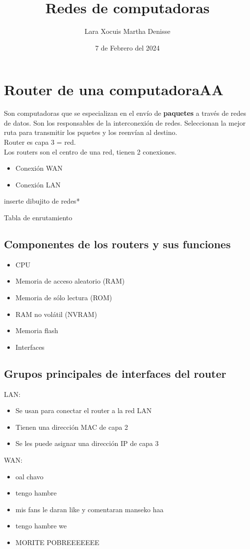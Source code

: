 \documentclass[letterpaper,12pt]{article}
\title {\textbf{Redes de computadoras}}
\author{Lara Xocuis Martha Denisse}
\date{7 de Febrero del 2024}
\begin{document}
\maketitle
\newpage
\begin{sloppypar}

\section{Router de una computadoraAA}
Son computadoras que se especializan en el envío de \textbf{paquetes} a través de redes de datos. Son los responsables de la interconexión de redes. Seleccionan la mejor ruta para transmitir los pquetes y los reenvían al destino.
\vspace{0.3cm}\\ 
Router es capa 3 = red.
\vspace{0.3cm}\\
Los routers son el centro de una red, tienen 2 conexiones.
\begin{itemize}
    \item Conexión WAN 
    \item Conexión LAN
\end{itemize}

inserte dibujito de redes*

Tabla de enrutamiento

\subsection{Componentes de los routers y sus funciones} 
\begin{itemize}
    \item CPU 
    \item Memoria de acceso aleatorio (RAM)
    \item Memoria de sólo lectura (ROM)
    \item RAM no volátil (NVRAM)
    \item Memoria flash
    \item Interfaces
\end{itemize}

\subsection{Grupos principales de interfaces del router}
LAN:
\begin{itemize}
    \item Se usan para conectar el router a la red LAN 
    \item Tienen una dirección MAC de capa 2
    \item Se les puede asignar una dirección IP de capa 3
\end{itemize}
WAN:
\begin{itemize}
    \item oal chavo 
    \item tengo hambre
    \item mis fans le daran like y comentaran manseko haa
    \item tengo hambre we
    \item MORITE POBREEEEEEE
\end{itemize}


\end{sloppypar}
\end{document}

